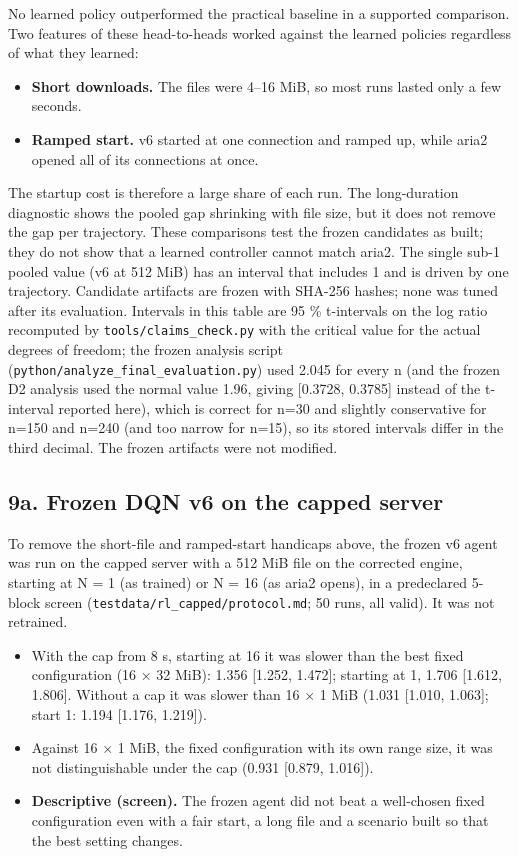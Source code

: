 \documentclass[conference]{IEEEtran}
\begin{document}
No learned policy outperformed the practical baseline in a supported comparison. Two features of these head-to-heads worked against the learned policies regardless of what they learned:

\begin{itemize}
\item \textbf{Short downloads.} The files were 4–16 MiB, so most runs lasted only a few seconds.
\item \textbf{Ramped start.} v6 started at one connection and ramped up, while aria2 opened all of its connections at once.
\end{itemize}

The startup cost is therefore a large share of each run. The long-duration diagnostic shows the pooled gap shrinking with file size, but it does not remove the gap per trajectory. These comparisons test the frozen candidates as built; they do not show that a learned controller cannot match aria2. The single sub-1 pooled value (v6 at 512 MiB) has an interval that includes 1 and is driven by one trajectory. Candidate artifacts are frozen with SHA-256 hashes; none was tuned after its evaluation. Intervals in this table are 95 \% t-intervals on the log ratio recomputed by \texttt{tools/\allowbreak{}claims\_check.py} with the critical value for the actual degrees of freedom; the frozen analysis script (\texttt{python/\allowbreak{}analyze\_final\_evaluation.py}) used 2.045 for every n (and the frozen D2 analysis used the normal value 1.96, giving [0.3728, 0.3785] instead of the t-interval reported here), which is correct for n=30 and slightly conservative for n=150 and n=240 (and too narrow for n=15), so its stored intervals differ in the third decimal. The frozen artifacts were not modified.


\subsection*{9a. Frozen DQN v6 on the capped server}

To remove the short-file and ramped-start handicaps above, the frozen v6 agent was run on the capped server with a 512 MiB file on the corrected engine, starting at N = 1 (as trained) or N = 16 (as aria2 opens), in a predeclared 5-block screen (\texttt{testdata/\allowbreak{}rl\_capped/\allowbreak{}protocol.md}; 50 runs, all valid). It was not retrained.


\begin{itemize}
\item With the cap from 8 s, starting at 16 it was slower than the best fixed configuration (16 × 32 MiB): 1.356 [1.252, 1.472]; starting at 1, 1.706 [1.612, 1.806]. Without a cap it was slower than 16 × 1 MiB (1.031 [1.010, 1.063]; start 1: 1.194 [1.176, 1.219]).
\item Against 16 × 1 MiB, the fixed configuration with its own range size, it was not distinguishable under the cap (0.931 [0.879, 1.016]).
\item \textbf{Descriptive (screen).} The frozen agent did not beat a well-chosen fixed configuration even with a fair start, a long file and a scenario built so that the best setting changes.
\end{itemize}
\end{document}

